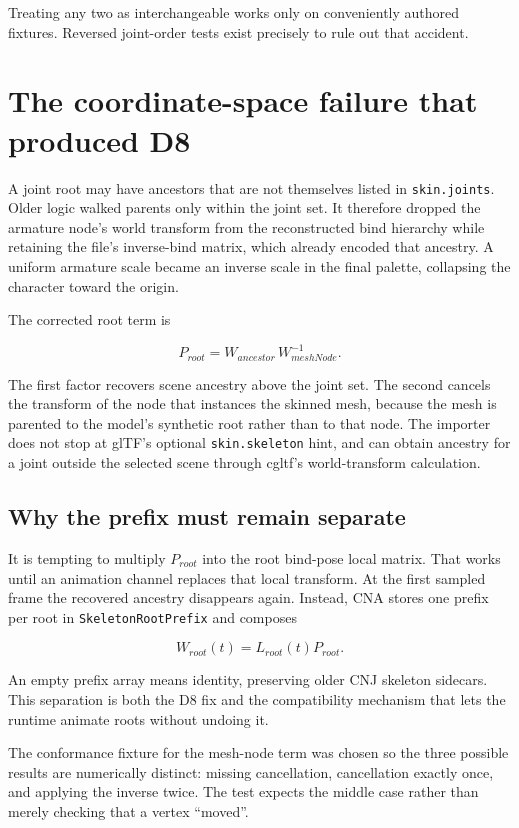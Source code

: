 Treating any two as interchangeable works only on conveniently authored fixtures. Reversed
joint-order tests exist precisely to rule out that accident.

\section{The coordinate-space failure that produced D8}

A joint root may have ancestors that are not themselves listed in \texttt{skin.joints}. Older
logic walked parents only within the joint set. It therefore dropped the armature node's world
transform from the reconstructed bind hierarchy while retaining the file's inverse-bind matrix,
which already encoded that ancestry. A uniform armature scale became an inverse scale in the
final palette, collapsing the character toward the origin.

The corrected root term is

\[
  P_{root} = W_{ancestor} \, W_{meshNode}^{-1}.
\]

The first factor recovers scene ancestry above the joint set. The second cancels the transform
of the node that instances the skinned mesh, because the mesh is parented to the model's
synthetic root rather than to that node. The importer does not stop at glTF's optional
\texttt{skin.skeleton} hint, and can obtain ancestry for a joint outside the selected scene
through cgltf's world-transform calculation.

\subsection{Why the prefix must remain separate}

It is tempting to multiply $P_{root}$ into the root bind-pose local matrix. That works until an
animation channel replaces that local transform. At the first sampled frame the recovered
ancestry disappears again. Instead, CNA stores one prefix per root in
\texttt{SkeletonRootPrefix} and composes

\[
  W_{root}(t) = L_{root}(t) P_{root}.
\]

An empty prefix array means identity, preserving older CNJ skeleton sidecars. This separation
is both the D8 fix and the compatibility mechanism that lets the runtime animate roots without
undoing it.

The conformance fixture for the mesh-node term was chosen so the three possible results are
numerically distinct: missing cancellation, cancellation exactly once, and applying the
inverse twice. The test expects the middle case rather than merely checking that a vertex
``moved''.

